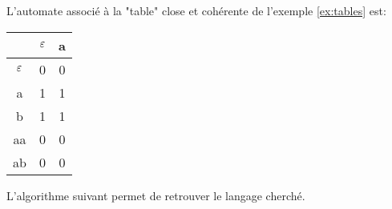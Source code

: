 \begin{exemple}
	L'automate associé à la "table" close et cohérente de l'exemple \ref{ex:tables} est: \\
	\begin{minipage}{0.5\textwidth}
		\centering
		\begin{tabular}{c|c|c}
			           & $\varepsilon$ & a \\ \hline
			$\varepsilon$ & 0          & 0 \\
			a          & 1          & 1 \\ \hline

			b          & 1          & 1 \\
			aa         & 0          & 0 \\
			ab         & 0          & 0 \\
		\end{tabular}
	\end{minipage}
	\begin{minipage}{0.5\textwidth}
		\centering
		\begin{automata}
		\end{automata}
	\end{minipage}
\end{exemple}

\vspace{1cm}


L'algorithme suivant permet de retrouver le langage cherché.

